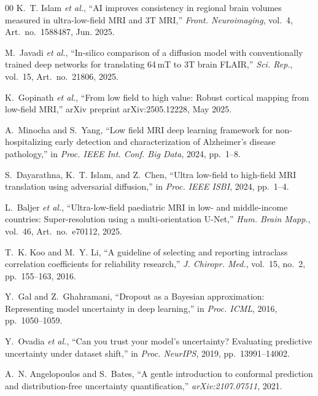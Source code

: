 \documentclass[12pt,a4paper]{article}
\begin{document}
\begin{thebibliography}{00}
K.~T. Islam \emph{et al.},
``AI improves consistency in regional brain volumes measured in
ultra-low-field MRI and 3T MRI,''
\emph{Front. Neuroimaging}, vol.~4, Art.~no.~1588487, Jun. 2025.

M.~Javadi \emph{et al.},
``In-silico comparison of a diffusion model with conventionally trained
deep networks for translating 64\,mT to 3T brain FLAIR,''
\emph{Sci. Rep.}, vol.~15, Art.~no.~21806, 2025.

K.~Gopinath \emph{et al.},
``From low field to high value: Robust cortical mapping from
low-field MRI,''
arXiv preprint arXiv:2505.12228, May 2025.

A.~Minocha and S.~Yang,
``Low field MRI deep learning framework for non-hospitalizing early
detection and characterization of Alzheimer's disease pathology,''
in \emph{Proc. IEEE Int. Conf. Big Data}, 2024, pp.~1--8.

S.~Dayarathna, K.~T. Islam, and Z.~Chen,
``Ultra low-field to high-field MRI translation using adversarial
diffusion,''
in \emph{Proc. IEEE ISBI}, 2024, pp.~1--4.

L.~Baljer \emph{et al.},
``Ultra-low-field paediatric MRI in low- and middle-income countries:
Super-resolution using a multi-orientation {U-Net},''
\emph{Hum. Brain Mapp.}, vol.~46, Art.~no.~e70112, 2025.

T.~K. Koo and M.~Y. Li,
``A guideline of selecting and reporting intraclass correlation
coefficients for reliability research,''
\emph{J. Chiropr. Med.}, vol.~15, no.~2, pp.~155--163, 2016.

Y.~Gal and Z.~Ghahramani,
``Dropout as a Bayesian approximation: Representing model uncertainty
in deep learning,''
in \emph{Proc. ICML}, 2016, pp.~1050--1059.

Y.~Ovadia \emph{et al.},
``Can you trust your model's uncertainty? Evaluating predictive
uncertainty under dataset shift,''
in \emph{Proc. NeurIPS}, 2019, pp.~13991--14002.

A.~N. Angelopoulos and S.~Bates,
``A gentle introduction to conformal prediction and distribution-free
uncertainty quantification,''
\emph{arXiv:2107.07511}, 2021.

\end{thebibliography}
\end{document}

